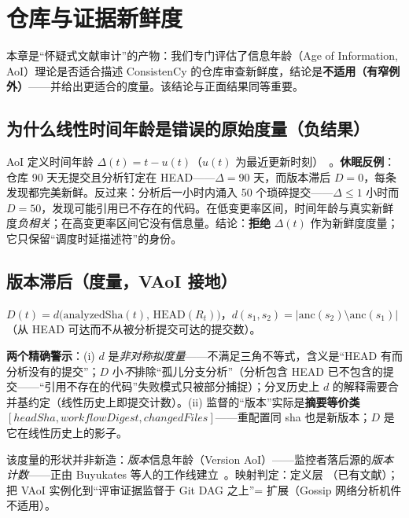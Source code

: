 \chapter{仓库与证据新鲜度}\label{ch:freshness}

本章是“怀疑式文献审计”的产物：我们专门评估了信息年龄（Age of Information, AoI）理论是否适合描述 ConsistenCy 的仓库审查新鲜度，结论是\textbf{不适用（有窄例外）}——并给出更适合的度量。该结论与正面结果同等重要。

\section{为什么线性时间年龄是错误的原始度量（负结果）}

AoI 定义时间年龄 $\Delta(t)=t-u(t)$（$u(t)$ 为最近更新时刻）~\cite{yates2021}。\textbf{休眠反例}：仓库 90 天无提交且分析钉定在 HEAD——$\Delta=90$ 天，而版本滞后 $D=0$，每条发现都完美新鲜。反过来：分析后一小时内涌入 50 个琐碎提交——$\Delta\le1$ 小时而 $D=50$，发现可能引用已不存在的代码。在低变更率区间，时间年龄与真实新鲜度\emph{负相关}；在高变更率区间它没有信息量。结论：\textbf{拒绝} $\Delta(t)$ 作为新鲜度度量；它只保留“调度时延描述符”的身份。

\section{版本滞后（\PROPOSED 度量，VAoI 接地）}

\begin{definition}[版本滞后]\label{def:versionstaleness}
$D(t)=d\bigl(\mathrm{analyzedSha}(t),\,\mathrm{HEAD}(R_t)\bigr)$，$d(s_1,s_2)=\bigl|\mathrm{anc}(s_2)\setminus\mathrm{anc}(s_1)\bigr|$（从 HEAD 可达而不从被分析提交可达的提交数）。
\end{definition}
\textbf{两个精确警示}：(i) $d$ 是\emph{非对称拟度量}——不满足三角不等式，含义是“HEAD 有而分析没有的提交”；$D$ 小\emph{不}排除“孤儿分支分析”（分析包含 HEAD 已不包含的提交——“引用不存在的代码”失败模式只被部分捕捉）；分叉历史上 $d$ 的解释需要合并基约定（线性历史上即提交计数）。(ii) 监督的“版本”实际是\textbf{摘要等价类} $[headSha, workflowDigest, changedFiles]$——重配置同 sha 也是新版本；$D$ 是它在线性历史上的影子。

该度量的形状并非新造：\emph{版本}信息年龄（Version AoI）——监控者落后源的\emph{版本计数}——正由 Buyukates 等人的工作线建立~\cite{buyukates2021}。映射判定：定义层 \USEFUL（已有文献）；把 VAoI 实例化到“评审证据监督于 Git DAG 之上”= \PROPOSED 扩展（Gossip 网络分析机件不适用）。

